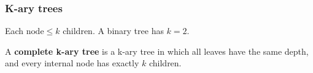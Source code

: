     \subsubsection{K-ary trees}
    \begin{definition}
            Each $\text{node} \leq k$ children. A binary tree has \( k = 2 \).
            \vspace{1em}

            A \textbf{complete k-ary tree} is a k-ary tree in which all leaves have the same depth, and every internal node has exactly \( k \) children. 
    \end{definition}

    

